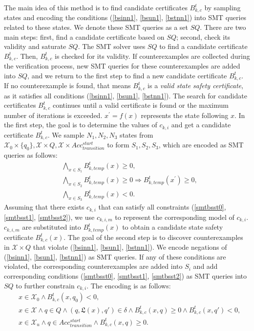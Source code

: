 \documentclass[acmlarge]{acmart}
\begin{document}
The main idea of this method is to find candidate certificates $B^t_{k, c}$ by sampling states and encoding the conditions (\ref{bsinn1}, \ref{bsun1}, \ref{bstnn1}) into SMT queries related to these states. 
We denote these SMT queries as a set $SQ$. 
There are two main steps: first, find a candidate certificate based on $SQ$; second, check its validity and saturate $SQ$. The SMT solver uses $SQ$ to find a candidate certificate $B^t_{k, c}$. 
Then, $B^t_{k, c}$ is checked for its validity. 
If counterexamples are collected during the verification process, new SMT queries for these counterexamples are added into $SQ$, 
and we return to the first step to find a new candidate certificate $B^t_{k, c}$. 
If no counterexample is found, that means $B^t_{k,c}$ is a \emph{valid state safety certificate}, as it satisfies all conditions (\ref{bsinn1}, \ref{bsun1}, \ref{bstnn1}). 
The search for candidate certificates $B^t_{k, c}$ continues until a valid certificate is found or the maximum number of iterations is exceeded.
$x^{\prime} = f(x)$ represents the state following $x$. 
In the first step, the goal is to determine the values of $c_{k,i}$ and get a candidate certificate $B^t_{k,c}$. We sample $N_1, N_2, N_3$ states from $\mathcal{X}_0 \times \{q_0\}, \mathcal{X} \times Q, \mathcal{X} \times Acc_{transition}^{start}$ to form $S_1, S_2, S_3$, which are encoded as SMT queries as follows:
\begin{align}
  &\bigwedge_{x \in S_1} B^t_{k, temp}(x) \geq 0, \label{smtbsst0}\\
  &\bigwedge_{x \in S_2} B^t_{k, temp}(x) \geq 0 \Rightarrow B^t_{k, temp}(x^{\prime}) \geq 0, \label{smtbsst1}\\
  &\bigwedge_{x \in S_3} B^t_{k, temp}(x) < 0. \label{smtbsst2}
\end{align}
Assuming that there exists $c_{k, i}$ that can satisfy all constraints (\ref{smtbsst0}, \ref{smtbsst1}, \ref{smtbsst2}), 
we use $c_{k,i,m}$ to represent the corresponding model of $c_{k,i}$. 
$c_{k, i, m}$ are substituted into $B^t_{k, temp}(x)$ to obtain a candidate state safety certificate $B^t_{k, c}(x)$. The goal of the second step is to discover counterexamples in $\mathcal{X} \times Q$ that violate (\ref{bsinn1}, \ref{bsun1}, \ref{bstnn1}). We encode negations of (\ref{bsinn1}, \ref{bsun1}, \ref{bstnn1}) as SMT queries. If any of these conditions are violated, the corresponding counterexamples are added into $S_i$ and add corresponding conditions (\ref{smtbsst0}, \ref{smtbsst1}, \ref{smtbsst2}) as SMT queries into $SQ$ to further constrain $c_{k, i}$. The encoding is as follows:
\begin{align}
&x \in \mathcal{X}_0 \land B^t_{k, c}(x, q_0) < 0, \label{smtbssc0} \\
&x \in \mathcal{X} \land q \in Q \land (q, \mathfrak{L}(x), q') \in \delta \land B^t_{k, c}(x, q) \geq 0 \land B^t_{k, c}(x, q') < 0, \label{smtbssc1} \\
&x \in \mathcal{X}_u \land q \in Acc_{transition}^{start} \land  B^t_{k, c}(x, q) \geq 0. \label{smtbssc2}
\end{align}
\end{document}
